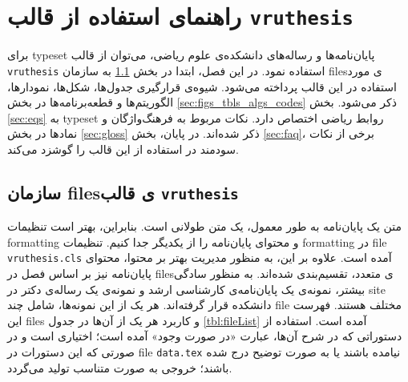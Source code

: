 \chapter{راهنمای استفاده از قالب \texttt{vruthesis}}

برای \gls{typeset} پایان‌نامه‌ها و رساله‌های دانشکده‌ی علوم ریاضی، می‌توان از قالب \texttt{vruthesis} استفاده نمود. در این فصل، ابتدا در بخش \ref{sec:file_org} به سازمان \glspl{file}ی مورد استفاده در این قالب پرداخته می‌شود. شیوه‌ی قرارگیری جدول‌ها، شکل‌ها، نمودارها، الگوریتم‌ها و قطعه‌برنامه‌ها در بخش \ref{sec:figs_tbls_algs_codes} ذکر می‌شود. بخش \ref{sec:eqs} به \gls{typeset}ِ روابط ریاضی اختصاص دارد. نکات مربوط به فرهنگ‌واژگان و نمادها در بخش \ref{sec:gloss} ذکر شده‌اند. در پایان، بخش \ref{sec:faq}، برخی از نکات سودمند در استفاده از این قالب را گوشزد می‌کند.

\section{سازمان \glspl*{file}ی قالب \texttt{vruthesis}}\label{sec:file_org} 
	متن یک پایان‌نامه به طور معمول، یک متن طولانی است. بنابراین، بهتر است تنظیمات \gls{formatting} و محتوای پایان‌نامه را از یکدیگر جدا کنیم. تنظیمات \gls{formatting} در \gls{file} \texttt{vruthesis.cls} آمده است. علاوه بر این، به منظور مدیریت بهتر بر محتوا، محتوای پایان‌نامه نیز بر اساس فصل در \glspl{file}ی متعدد، تقسیم‌بندی شده‌اند. به منظور سادگی بیشتر، نمونه‌ی یک پایان‌نامه‌ی کارشناسی ارشد و نمونه‌ی یک رساله‌ی دکتر در \gls{site} دانشکده قرار گرفته‌اند. هر یک از این نمونه‌ها، شامل چند \gls{file} مختلف هستند. فهرست این \glspl{file} و کاربرد هر یک از آن‌ها در جدول \ref{tbl:fileList} آمده است. استفاده از دستوراتی که در شرح آن‌ها، عبارت «در صورت وجود» آمده است؛ اختیاری است و در صورتی که این دستورات در \gls{file} \verb|data.tex| نیامده باشند یا به صورت توضیح درج شده باشند؛ خروجی به صورت متناسب تولید می‌گردد.

